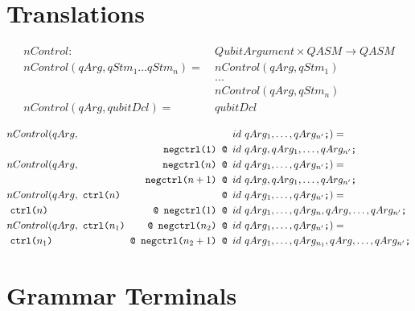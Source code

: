\begin{appendices}
\chapter{Translations}
\label{appendix:translation}

\begin{align*}
    nControl : \ & QubitArgument \times QASM \to QASM\\
    nControl(qArg, qStm_1 \dots qStm_n) = \ & nControl(qArg, qStm_1)\\
        & ...\\
        & nControl(qArg, qStm_n)\\
    nControl(qArg, qubitDcl) = \ & qubitDcl\\
\end{align*}
{\small
    \begin{align*}
        &nControl(qArg,  &&  id \ qArg_1, \dots, qArg_{n'} \texttt{;}) = \\  
        & & \quad \texttt{negctrl(1) } \texttt{@ }& id \ qArg, qArg_1, \dots, qArg_{n'}\texttt{;}\\
        &nControl(qArg,  & \quad \texttt{negctrl(}n \texttt{) } \texttt{@ }& id \ qArg_1, \dots, qArg_{n'} \texttt{;}) = \\
        & & \quad \texttt{negctrl(}n+1 \texttt{) } \texttt{@ }& id \ qArg, qArg_1, \dots, qArg_{n'}\texttt{;}\\
        &nControl(qArg,  \ \rlap{$\texttt{ctrl(}n\texttt{) }$} &\texttt{@ }& id \ qArg_1, \dots, qArg_{n'} \texttt{;}) = \\
        & \ \texttt{ctrl($n$) } &\texttt{@ } \texttt{negctrl(}1\texttt{) } \texttt{@ }&id \ qArg_1, \dots, qArg_n, qArg, \dots, qArg_{n'}\texttt{;}\\
        &nControl(qArg,  \ \texttt{ctrl(}n_1 \texttt{)} & \texttt{@ } \texttt{negctrl(}n_2\texttt{) } \texttt{@ }& id \ qArg_1, \dots, qArg_{n'} \texttt{;}) = \\
        & \ \texttt{ctrl(}n_1 \texttt{) } &\llap{$\texttt{@ } \texttt{negctrl(}n_2+1\texttt{) }$} \texttt{@ }& id \  qArg_1, \dots, qArg_{n_1}, qArg, \dots, qArg_{n'}\texttt{;}
    \end{align*}
}%

\chapter{Grammar Terminals}
\label{appendix:grammar_terminals}



\end{appendices}
